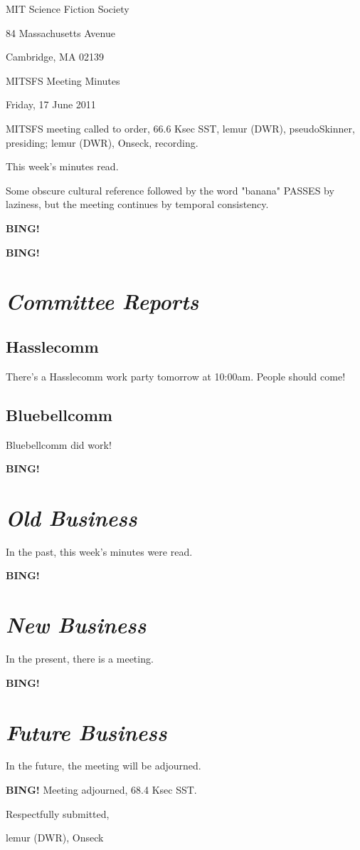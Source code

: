 \documentclass[10pt]{article}
\newcommand{\bing}{{\bf BING!} }
\newcommand{\goto}[1]{\bing \vskip 12pt \section*{{\em{#1}}}}
\newcommand{\skinner}{lemur (DWR), pseudoSkinner}
\newcommand{\onseck}{lemur (DWR), Onseck}
\newcommand{\meetingdate}{Friday, 17 June 2011}
\begin{document}
\begin{center}

MIT Science Fiction Society

84 Massachusetts Avenue

Cambridge, MA 02139

\vspace{12pt}

MITSFS Meeting Minutes

\meetingdate

\end{center}

\vspace{18pt}

\setlength{\parskip}{6pt}

\noindent
MITSFS meeting called to order, 66.6 Ksec SST,
\skinner, presiding; \onseck, recording.

This week's minutes read.

Some obscure cultural reference followed by the word "banana" PASSES by
laziness, but the meeting continues by temporal consistency.

\bing

\goto{Committee Reports}

\subsection*{Hasslecomm}

There's a Hasslecomm work party tomorrow at 10:00am.  People should come!

\subsection*{Bluebellcomm}

Bluebellcomm did work!

\goto{Old Business}

In the past, this week's minutes were read.

\goto{New Business}

In the present, there is a meeting.

\goto{Future Business}

In the future, the meeting will be adjourned.

\bing
\noindent
Meeting adjourned, 68.4 Ksec SST.

\vspace{18pt}

\centerline{Respectfully submitted,}
\centerline{\onseck}
\end{document}
